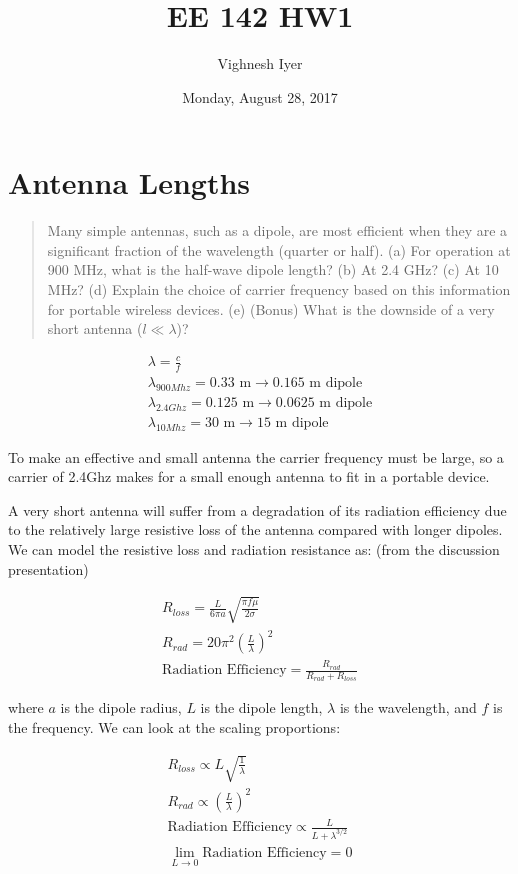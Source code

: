 \documentclass[11pt]{article}
\begin{document}
\title{EE 142 HW1}

\author{Vighnesh Iyer}
\date{Monday, August 28, 2017}
\maketitle

\section{Antenna Lengths}
\begin{quote}
	Many simple antennas, such as a dipole, are most efficient when they are a significant fraction of the wavelength (quarter or half). (a) For operation at 900 MHz, what is the half-wave dipole length? (b) At 2.4 GHz? (c) At 10 MHz? (d) Explain the choice	of carrier frequency based on this information for portable wireless devices. (e) (Bonus) What is the downside of a very short antenna ($l \ll \lambda$)?
\end{quote}

\begin{eqnarray}
	\lambda = \frac{c}{f} \nonumber \\
	\lambda_{900Mhz} = 0.33 \text{ m} \rightarrow \text{0.165 m dipole} \nonumber \\
	\lambda_{2.4Ghz} = 0.125 \text{ m} \rightarrow \text{0.0625 m dipole} \nonumber \\
	\lambda_{10Mhz} = 30 \text{ m} \rightarrow \text{15 m dipole} \nonumber
\end{eqnarray}

To make an effective and small antenna the carrier frequency must be large, so a carrier of 2.4Ghz makes for a small enough antenna to fit in a portable device.

A very short antenna will suffer from a degradation of its radiation efficiency due to the relatively large resistive loss of the antenna compared with longer dipoles. We can model the resistive loss and radiation resistance as: (from the discussion presentation)

\begin{eqnarray}
	R_{loss} = \frac{L}{6 \pi a} \sqrt{\frac{\pi f \mu}{2 \sigma}} \nonumber \\
	R_{rad} = 20 \pi^2 (\frac{L}{\lambda})^2 \nonumber \\
	\text{Radiation Efficiency} = \frac{R_{rad}}{R_{rad} + R_{loss}} \nonumber
\end{eqnarray}

where $a$ is the dipole radius, $L$ is the dipole length, $\lambda$ is the wavelength, and $f$ is the frequency. We can look at the scaling proportions:

\begin{eqnarray}
	R_{loss} \propto L \sqrt{\frac{1}{\lambda}} \nonumber \\
	R_{rad} \propto (\frac{L}{\lambda})^2 \nonumber \\
	\text{Radiation Efficiency} \propto \frac{L}{L + \lambda^{3/2}} \nonumber \\
	\lim\limits_{L \rightarrow 0} \text{Radiation Efficiency} = 0 \nonumber
\end{eqnarray}
\end{document}
